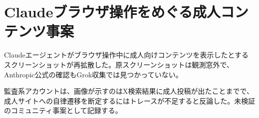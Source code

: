 \section{Claudeブラウザ操作をめぐる成人コンテンツ事案}
Claudeエージェントがブラウザ操作中に成人向けコンテンツを表示したとするスクリーンショットが再拡散した。原スクリーンショットは観測窓外で、Anthropic公式の確認もGrok収集では見つかっていない。

監査系アカウントは、画像が示すのはX検索結果に成人投稿が出たことまでで、成人サイトへの自律遷移を断定するにはトレースが不足すると反論した。未検証のコミュニティ事案として記録する。
